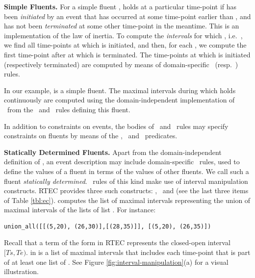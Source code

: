 \textbf{Simple Fluents.} 
For a simple fluent ,  holds at a particular time-point  if  has been \emph{initiated} by an event that has occurred at some time-point earlier than , and has not been \emph{terminated} at some other time-point in the meantime. This is an implementation of the law of inertia. 
To compute the \emph{intervals}  for which , i.e.~, we find all time-points  at which  is initiated, and then, for each , we compute the first time-point  after  at which  is terminated.
The time-points at which  is initiated (respectively terminated) are computed by means of domain-specific \initiatedAt\ (resp.~\terminatedAt) rules. 

In our example,  is a simple fluent. 
The maximal intervals during which  holds continuously are computed using the domain-independent implementation of \holdsFor\ from the \initiatedAt\ and \terminatedAt\ rules defining this fluent.

In addition to constraints on events, the bodies of \initiatedAt\ and \terminatedAt\ rules may specify constraints on fluents by means of the \holdsAt, \initiatedAt\ and \terminatedAt\ predicates.

\textbf{Statically Determined Fluents.}
Apart from the domain-independent definition of \holdsFor, an event description may include domain-specific \holdsFor\ rules, used to define the values of a fluent  in terms of the values of other fluents. We call such a fluent  \emph{statically determined}. 
\holdsFor\ rules of this kind make use of interval manipulation constructs. 
RTEC provides three such constructs: \unionall, \intersectall\ and \complementall (see the last three items of Table \ref{tbl:ec}).  computes the list  of maximal intervals representing the union of maximal intervals of the lists of list . For instance: 

{\small
\begin{verbatim}
union_all([[(5,20), (26,30)],[(28,35)]], [(5,20), (26,35)])
\end{verbatim}
}

Recall that a term of the form  in RTEC represents the closed-open interval $\mathit{[Ts, Te)}$.  in  is a list of maximal intervals that includes each time-point that is part of at least one list of . See Figure \ref{fig:interval-manipulation}(a) for a visual illustration.


